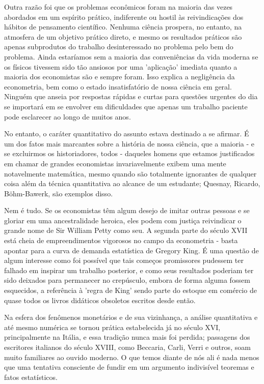 \documentclass[12pt]{article}
\begin{document}
Outra razão foi que os problemas econômicos foram na maioria das vezes abordados em um espírito prático, indiferente ou hostil às reivindicações dos hábitos de pensamento científico. Nenhuma ciência prospera, no entanto, na atmosfera de um objetivo prático direto, e mesmo os resultados práticos são apenas subprodutos do trabalho desinteressado no problema pelo bem do problema. Ainda estaríamos sem a maioria das conveniências da vida moderna se os físicos tivessem sido tão ansiosos por uma 'aplicação' imediata quanto a maioria dos economistas são e sempre foram. Isso explica a negligência da econometria, bem como o estado insatisfatório de nossa ciência em geral. Ninguém que anseia por respostas rápidas e curtas para questões urgentes do dia se importará em se envolver em dificuldades que apenas um trabalho paciente pode esclarecer ao longo de muitos anos.

No entanto, o caráter quantitativo do assunto estava destinado a se afirmar. É um dos fatos mais marcantes sobre a história de nossa ciência, que a maioria - e se excluirmos os historiadores, todos - daqueles homens que estamos justificados em chamar de grandes economistas invariavelmente exibem uma mente notavelmente matemática, mesmo quando são totalmente ignorantes de qualquer coisa além da técnica quantitativa ao alcance de um estudante; Quesnay, Ricardo, Böhm-Bawerk, são exemplos disso.

Nem é tudo. Se os economistas têm algum desejo de imitar outras pessoas e se gloriar em uma ancestralidade heroica, eles podem com justiça reivindicar o grande nome de Sir William Petty como seu. A segunda parte do século XVII está cheia de empreendimentos vigorosos no campo da econometria - basta apontar para a curva de demanda estatística de Gregory King. É uma questão de algum interesse como foi possível que tais começos promissores pudessem ter falhado em inspirar um trabalho posterior, e como seus resultados poderiam ter sido deixados para permanecer no crepúsculo, embora de forma alguma fossem esquecidos, a referência à 'regra de King' sendo parte do estoque em comércio de quase todos os livros didáticos obsoletos escritos desde então.

Na esfera dos fenômenos monetários e de sua vizinhança, a análise quantitativa e até mesmo numérica se tornou prática estabelecida já no século XVI, principalmente na Itália, e essa tradição nunca mais foi perdida; passagens dos escritores italianos do século XVIII, como Beccaria, Carli, Verri e outros, soam muito familiares ao ouvido moderno. O que temos diante de nós ali é nada menos que uma tentativa consciente de fundir em um argumento indivisível teoremas e fatos estatísticos.
\end{document}
